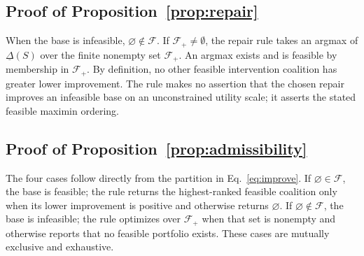 \documentclass[review]{elsarticle}
\theoremstyle{plain}
\theoremstyle{definition}
\theoremstyle{remark}
\begin{document}
\begin{appendices}
\subsection*{Proof of Proposition~\ref{prop:repair}}
When the base is infeasible, $\varnothing\notin\mathcal F$. If $\mathcal F_+\neq\emptyset$, the repair rule takes an argmax of $\underline\Delta(S)$ over the finite nonempty set $\mathcal F_+$. An argmax exists and is feasible by membership in $\mathcal F_+$. By definition, no other feasible intervention coalition has greater lower improvement. The rule makes no assertion that the chosen repair improves an infeasible base on an unconstrained utility scale; it asserts the stated feasible maximin ordering.

\subsection*{Proof of Proposition~\ref{prop:admissibility}}
The four cases follow directly from the partition in Eq.~\eqref{eq:improve}. If $\varnothing\in\mathcal F$, the base is feasible; the rule returns the highest-ranked feasible coalition only when its lower improvement is positive and otherwise returns $\varnothing$. If $\varnothing\notin\mathcal F$, the base is infeasible; the rule optimizes over $\mathcal F_+$ when that set is nonempty and otherwise reports that no feasible portfolio exists. These cases are mutually exclusive and exhaustive.


\end{appendices}
\end{document}
